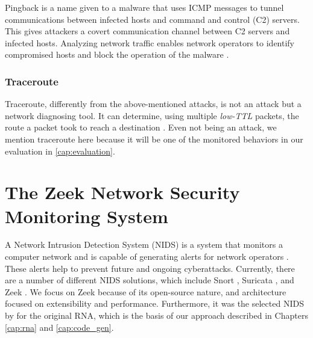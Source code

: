 Pingback is a name given to a malware that uses ICMP messages to tunnel communications between infected hosts and command and control (C2) servers. This gives attackers a covert communication channel between C2 servers and infected hosts. Analyzing network traffic enables network operators to identify compromised hosts and block the operation of the malware \cite{PingbackAttack}.

\subsubsection*{Traceroute}
\label{sec:bg:traceroute}

Traceroute, differently from the above-mentioned attacks, is not an attack but a network diagnosing tool. It can determine, using multiple \textit{low-TTL} packets, the route a packet took to reach a destination \cite{Traceroute}. Even not being an attack, we mention traceroute here because it will be one of the monitored behaviors in our evaluation in \autoref{cap:evaluation}.






\vspace{-0.5em}

\section{The Zeek Network Security Monitoring System}
\label{sec:bg:zeek}

\vspace{-0.5em}

A Network Intrusion Detection System (NIDS) is a system that monitors a computer network and is capable of generating alerts for network operators \cite{NIDSScienceDirect}. These alerts help to prevent future and ongoing cyberattacks. Currently, there are a number of different NIDS solutions, which include Snort \cite{SnortWebsite}, Suricata \cite{SuricataWebsite}, and Zeek \cite{ZeekWebsite}. We focus on Zeek because of its open-source nature, and architecture focused on extensibility and performance. Furthermore, it was the selected NIDS by  for the original RNA, which is the basis of our approach described in Chapters \ref{cap:rna} and \ref{cap:code_gen}.

